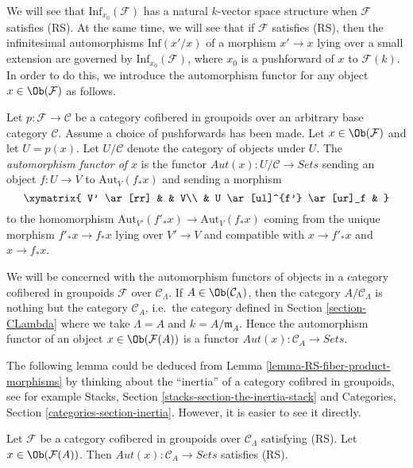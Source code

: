 \noindent
We will see that $\text{Inf}_{x_0}(\mathcal{F})$ has a natural $k$-vector
space structure when $\mathcal{F}$ satisfies (RS). At the same time, we will
see that if $\mathcal{F}$ satisfies (RS), then the infinitesimal automorphisms
$\text{Inf}(x'/x)$ of a morphism $x' \to x$ lying over a small
extension are governed by $\text{Inf}_{x_0}(\mathcal{F})$, where $x_0$ is
a pushforward of $x$ to $\mathcal{F}(k)$. In order to do this, we introduce
the automorphism functor for any object $x \in \Ob(\mathcal{F})$ as
follows.

\begin{definition}
\label{definition-automorphism-functor}
Let $p : \mathcal{F} \to \mathcal{C}$ be a category cofibered in groupoids
over an arbitrary base category $\mathcal{C}$. Assume a choice of pushforwards
has been made. Let $x \in \Ob(\mathcal{F})$ and let $U = p(x)$.
Let $U/\mathcal{C}$ denote the category of objects under $U$. The
{\it automorphism functor of $x$} is the functor
$\mathit{Aut}(x) : U/\mathcal{C} \to \textit{Sets}$ sending an object
$f : U \to V$ to $\text{Aut}_V(f_*x)$ and sending a morphism
$$
\xymatrix{
V' \ar[rr] &                    & V\\
          & U \ar[ul]^{f'}  \ar[ur]_f &
}
$$
to the homomorphism
$\text{Aut}_{V'}(f'_*x) \to \text{Aut}_V(f_*x)$
coming from the unique morphism $f'_*x \to f_*x$ lying over
$V' \to V$ and compatible with $x \to f'_*x$ and $x \to f_*x$.
\end{definition}

\noindent
We will be concerned with the automorphism functors of objects in a category
cofibered in groupoids $\mathcal{F}$ over $\mathcal{C}_\Lambda$. If
$A \in \Ob(\mathcal{C}_\Lambda)$, then the category
$A/\mathcal{C}_\Lambda$ is nothing but the category $\mathcal{C}_A$,
i.e.\ the category defined in Section \ref{section-CLambda}
where we take $\Lambda = A$ and $k = A/\mathfrak m_A$.
Hence the automorphism functor of an object
$x \in \Ob(\mathcal{F}(A))$ is a functor
$\mathit{Aut}(x) : \mathcal{C}_A \to \textit{Sets}$.

\medskip\noindent
The following lemma could be deduced from
Lemma \ref{lemma-RS-fiber-product-morphisms}
by thinking about the ``inertia'' of a category cofibred in groupoids,
see for example
Stacks, Section \ref{stacks-section-the-inertia-stack}
and
Categories, Section \ref{categories-section-inertia}.
However, it is easier to see it directly.

\begin{lemma}
\label{lemma-Aut-functor-RS}
Let $\mathcal{F}$ be a category cofibered in groupoids over
$\mathcal{C}_\Lambda$ satisfying (RS). Let
$x \in \Ob(\mathcal{F}(A))$. Then
$\mathit{Aut}(x): \mathcal{C}_A \to \textit{Sets}$ satisfies (RS).
\end{lemma}

